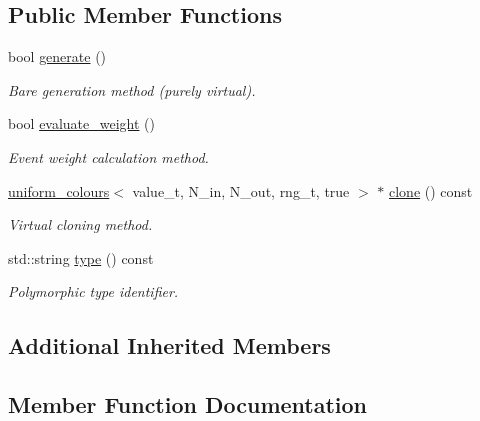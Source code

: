\subsection*{Public Member Functions}
\begin{DoxyCompactItemize}
\item 
bool \hyperlink{a00559_ad1769415de6a7b3bb5b6337bde287f10}{generate} ()
\begin{DoxyCompactList}\small\item\em \textquotesingle{}Bare generation\textquotesingle{} method (purely virtual). \end{DoxyCompactList}\item 
\hypertarget{a00559_ab269d4763f5fe3ec4cc355db255f07a2}{}bool \hyperlink{a00559_ab269d4763f5fe3ec4cc355db255f07a2}{evaluate\+\_\+weight} ()\label{a00559_ab269d4763f5fe3ec4cc355db255f07a2}

\begin{DoxyCompactList}\small\item\em Event weight calculation method. \end{DoxyCompactList}\item 
\hypertarget{a00559_a46844036645e70b5c10966646412520e}{}\hyperlink{a00557}{uniform\+\_\+colours}$<$ value\+\_\+t, N\+\_\+in, N\+\_\+out, rng\+\_\+t, true $>$ $\ast$ \hyperlink{a00559_a46844036645e70b5c10966646412520e}{clone} () const \label{a00559_a46844036645e70b5c10966646412520e}

\begin{DoxyCompactList}\small\item\em Virtual cloning method. \end{DoxyCompactList}\item 
\hypertarget{a00559_afa1f3cc1a72f983c45a615690a6dc60f}{}std\+::string \hyperlink{a00559_afa1f3cc1a72f983c45a615690a6dc60f}{type} () const \label{a00559_afa1f3cc1a72f983c45a615690a6dc60f}

\begin{DoxyCompactList}\small\item\em Polymorphic type identifier. \end{DoxyCompactList}\end{DoxyCompactItemize}
\subsection*{Additional Inherited Members}


\subsection{Member Function Documentation}
\hypertarget{a00559_ad1769415de6a7b3bb5b6337bde287f10}{}
